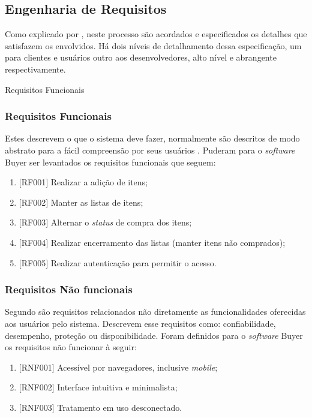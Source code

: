 \documentclass[
	12pt,
	openright,
	oneside, %
	a4paper,
	chapter=TITLE,
	section=TITLE,
	english,
	brazil %
	]{abntex2-udesc}
\begin{document}
\subsection{Engenharia de Requisitos}

Como explicado por , neste processo são acordados e especificados os detalhes que satisfazem os envolvidos. Há dois níveis de detalhamento dessa especificação, um para clientes e usuários outro aos desenvolvedores, alto nível e abrangente respectivamente.

Requisitos Funcionais

\subsubsection{Requisitos Funcionais}

Estes descrevem o que o sistema deve fazer, normalmente são descritos de modo abstrato para a fácil compreensão por seus usuários \cite{sommerville2011}. Puderam para o \textit{software} Buyer ser levantados os requisitos funcionais que seguem:
\begin{enumerate}
\item $[$RF001$]$ Realizar a adição de itens;
\item $[$RF002$]$ Manter as listas de itens;
\item $[$RF003$]$ Alternar o \textit{status} de compra dos itens;
\item $[$RF004$]$ Realizar encerramento das listas (manter itens não comprados);
\item $[$RF005$]$ Realizar autenticação para permitir o acesso.
\end{enumerate}

\subsubsection{Requisitos Não funcionais}


Segundo  são requisitos relacionados não diretamente as funcionalidades oferecidas aos usuários pelo sistema. Descrevem esse requisitos como: confiabilidade, desempenho, proteção ou disponibilidade.
Foram definidos para o \textit{software} Buyer os requisitos não funcionar à seguir:
\begin{enumerate}
\item $[$RNF001$]$ Acessível por navegadores, inclusive \textit{mobile};
\item $[$RNF002$]$ Interface intuitiva e minimalista;
\item $[$RNF003$]$ Tratamento em uso desconectado.
\end{enumerate}
\end{document}
